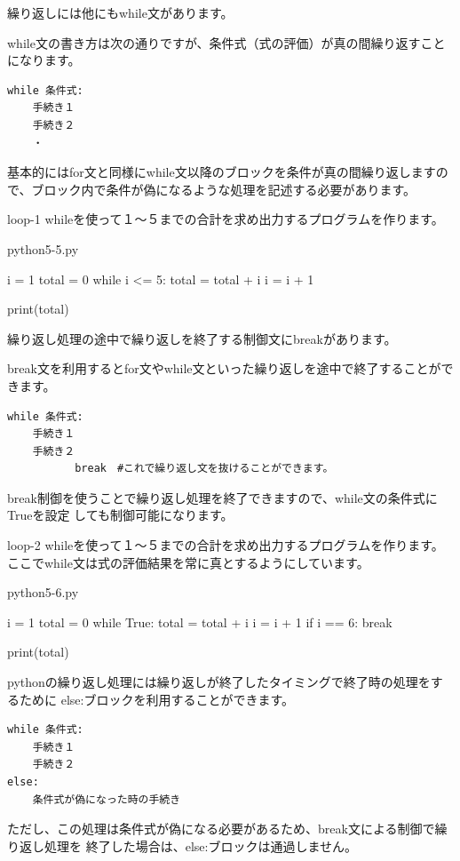 \documentclass[11pt,a4paper,dvipdfmx,titlepage]{jsreport}
\begin{document}
繰り返しには他にもwhile文があります。

while文の書き方は次の通りですが、条件式（式の評価）が真の間繰り返すことになります。
\begin{verbatim}
while 条件式:
    手続き１
    手続き２
    ・
\end{verbatim}
基本的にはfor文と同様にwhile文以降のブロックを条件が真の間繰り返しますので、ブロック内で条件が偽になるような処理を記述する必要があります。
\begin{pabox}{loop-1}
whileを使って１～５までの合計を求め出力するプログラムを作ります。


\begin{codebox}{python5-5.py}
\begin{listing}{1}
i = 1
total = 0
while i <= 5:
    total = total + i
    i = i + 1

print(total)
\end{listing}
\end{codebox}
\end{pabox}
繰り返し処理の途中で繰り返しを終了する制御文にbreakがあります。

break文を利用するとfor文やwhile文といった繰り返しを途中で終了することができます。

\begin{verbatim}
while 条件式:
    手続き１
    手続き２
    　　　　break　#これで繰り返し文を抜けることができます。
\end{verbatim}

break制御を使うことで繰り返し処理を終了できますので、while文の条件式にTrueを設定
しても制御可能になります。
\begin{pabox}{loop-2}
whileを使って１～５までの合計を求め出力するプログラムを作ります。
ここでwhile文は式の評価結果を常に真とするようにしています。


\begin{codebox}{python5-6.py}
\begin{listing}{1}
i = 1
total = 0
while True:
    total = total + i
    i = i + 1
    if i == 6:
        break

print(total)
\end{listing}
\end{codebox}
\end{pabox}

pythonの繰り返し処理には繰り返しが終了したタイミングで終了時の処理をするために
else:ブロックを利用することができます。

\begin{verbatim}
while 条件式:
    手続き１
    手続き２
else:
    条件式が偽になった時の手続き
\end{verbatim}
ただし、この処理は条件式が偽になる必要があるため、break文による制御で繰り返し処理を
終了した場合は、else:ブロックは通過しません。
\end{document}

